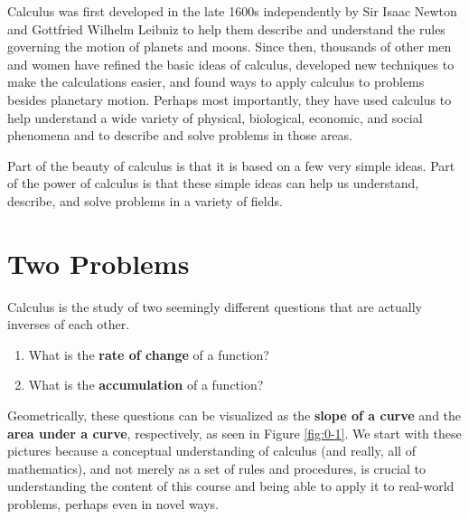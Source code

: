 Calculus was first developed in the late 1600s independently by Sir Isaac Newton and Gottfried Wilhelm Leibniz to help them describe and understand the rules governing the motion of planets and moons. Since then, thousands of other men and women have refined the basic ideas of calculus, developed new techniques to make the calculations easier, and found ways to apply calculus to problems besides planetary motion. Perhaps most importantly, they have used calculus to help understand a wide variety of physical, biological, economic, and social phenomena and to describe and solve problems in those areas.


Part of the beauty of calculus is that it is based on a few very simple ideas. Part of the power of calculus is that these simple ideas can help us understand, describe, and solve problems in a variety of fields.

\section{Two Problems}
\label{sec:twoproblems}

Calculus is the study of two seemingly different questions that are actually inverses of each other.
\begin{enumerate}
    \item What is the {\bf rate of change} of a function?
    \item What is the {\bf accumulation} of a function?
\end{enumerate}
Geometrically, these questions can be visualized as the {\bf slope of a curve} and the {\bf area under a curve}, respectively, as seen in Figure \ref{fig:0-1}. We start with these pictures because a conceptual understanding of calculus (and really, all of mathematics), and not merely as a set of rules and procedures, is crucial to understanding the content of this course and being able to apply it to real-world problems, perhaps even in novel ways.

